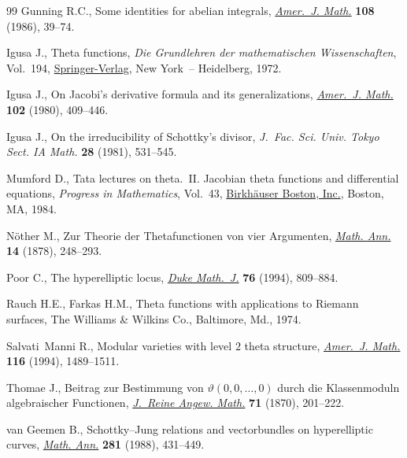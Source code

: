 \documentclass[pdftex]{sigma}
\numberwithin{equation}{section}
\begin{document}
\begin{thebibliography}{99}
Gunning R.C., Some identities for abelian integrals, \href{https://doi.org/10.2307/2374468}{\textit{Amer.~J. Math.}} \textbf{108} (1986), 39--74.

Igusa J., Theta functions, \textit{Die Grundlehren der mathematischen
 Wissenschaften}, Vol.~194, \href{https://doi.org/10.1007/978-3-642-65315-5}{Springer-Verlag}, New York~-- Heidelberg, 1972.

Igusa J., On {J}acobi's derivative formula and its generalizations,
 \href{https://doi.org/10.2307/2374245}{\textit{Amer.~J. Math.}} \textbf{102} (1980), 409--446.

Igusa J., On the irreducibility of {S}chottky's divisor, \textit{J.~Fac. Sci.
 Univ. Tokyo Sect. IA Math.} \textbf{28} (1981), 531--545.

Mumford D., Tata lectures on theta.~{II}. Jacobian theta functions and
 differential equations, \textit{Progress in Mathematics}, Vol.~43,
 \href{https://doi.org/10.1007/978-0-8176-4578-6}{Birkh\"{a}user Boston, Inc.}, Boston, MA, 1984.

N\"other M., Zur {T}heorie der {T}hetafunctionen von vier {A}rgumenten,
 \href{https://doi.org/10.1007/BF01677138}{\textit{Math. Ann.}} \textbf{14} (1878), 248--293.

Poor C., The hyperelliptic locus, \href{https://doi.org/10.1215/S0012-7094-94-07634-5}{\textit{Duke Math.~J.}} \textbf{76} (1994), 809--884.

Rauch H.E., Farkas H.M., Theta functions with applications to {R}iemann
 surfaces, The Williams \& Wilkins Co., Baltimore, Md., 1974.

Salvati~Manni R., Modular varieties with level {$2$} theta structure,
 \href{https://doi.org/10.2307/2375056}{\textit{Amer.~J. Math.}} \textbf{116} (1994), 1489--1511.

Thomae J., Beitrag zur {B}estimmung von {$\vartheta(0,0,\dots, 0)$} durch die
 {K}lassenmoduln algebraischer {F}unctionen, \href{https://doi.org/10.1515/crll.1870.71.201}{\textit{J.~Reine Angew. Math.}}
 \textbf{71} (1870), 201--222.

van Geemen B., Schottky--{J}ung relations and vectorbundles on hyperelliptic
 curves, \href{https://doi.org/10.1007/BF01457155}{\textit{Math. Ann.}} \textbf{281} (1988), 431--449.

\end{thebibliography}\LastPageEnding
\end{document}
